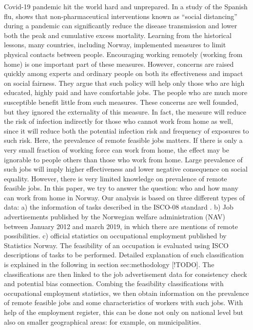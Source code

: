 \documentclass[11pt,]{article}
\begin{document}
Covid-19 pandemic hit the world hard and unprepared. In a study of the
Spanish flu, \citep{Hatchett7582} shows that non-pharmaceutical
interventions known as ``social distancing'' during a pandemic can
significantly reduce the disease transmission and lower both the peak
and cumulative excess mortality. Learning from the historical lessons,
many countries, including Norway, implemented measures to limit physical
contacts between people. Encouraging working remotely (working from
home) is one important part of these measures. However, concerns are
raised quickly among experts and ordinary people on both its
effectiveness and impact on social fairness. They argue that such policy
will help only those who are high educated, highly paid and have
comfortable jobs. The people who are much more susceptible benefit
little from such measures. These concerns are well founded, but they
ignored the externality of this measure. In fact, the measure will
reduce the risk of infection indirectly for those who cannot work from
home as well, since it will reduce both the potential infection risk and
frequency of exposures to such risk. Here, the prevalence of remote
feasible jobs matters. If there is only a very small fraction of working
force can work from home, the effect may be ignorable to people others
than those who work from home. Large prevalence of such jobs will imply
higher effectiveness and lower negative consequence on social equality.
However, there is very limited knowledge on prevalence of remote
feasible jobs. In this paper, we try to answer the question: who and how
many can work from home in Norway. Our analysis is based on three
different types of data: a) the information of tasks described in the
ISCO-08 standard \citep{ILO12}. b) Job advertisements published by the
Norwegian welfare administration (NAV) between January 2012 and march
2019, in which there are mentions of remote possibilities. c) official
statistics on occupational employment published by Statistics Norway.
The feasibility of an occupation is evaluated using ISCO descriptions of
tasks to be performed. Detailed explanation of such classification is
explained in the following in section sec:methodology {[}!TODO{]}. The
classifications are then linked to the job advertisement data for
consistency check and potential bias connection. Combing the feasibility
classifications with occupational employment statistics, we then obtain
information on the prevalence of remote feasible jobs and some
characteristics of workers with such jobs. With help of the employment
register, this can be done not only on national level but also on
smaller geographical areas: for example, on municipalities.
\end{document}

